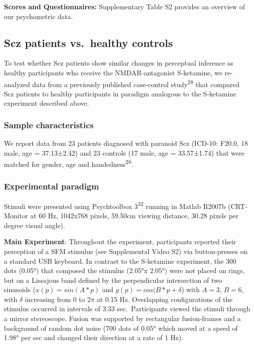 \documentclass[
]{article}
\begin{document}
\textbf{Scores and Questionnaires:} Supplementary Table S2 provides an
overview of our psychometric data.

\subsection{Scz patients vs.~healthy
controls}\label{scz-patients-vs.-healthy-controls}

To test whether Scz patients show similar changes in perceptual
inference as healthy participants who receive the NMDAR-antagonist
S-ketamine, we re-analyzed data from a previously published case-control
study\textsuperscript{28} that compared Scz patients to healthy
participants in paradigm analogous to the S-ketamine experiment
described above.

\subsubsection{Sample characteristics}\label{sample-characteristics-1}

We report data from 23 patients diagnosed with paranoid Scz (ICD-10:
F20.0, 18 male, age = 37.13±2.42) and 23 controls (17 male, age =
33.57±1.74) that were matched for gender, age and
handedness\textsuperscript{28}.

\subsubsection{Experimental paradigm}\label{experimental-paradigm-1}

Stimuli were presented using Psychtoolbox 3\textsuperscript{32} running
in Matlab R2007b (CRT-Monitor at 60 Hz, 1042x768 pixels, 59.50cm viewing
distance, 30.28 pixels per degree visual angle).

\textbf{Main Experiment}: Throughout the experiment, participants
reported their perception of a SFM stimulus (see Supplemental Video S2)
via button-presses on a standard USB keyboard. In contrast to the
S-ketamine experiment, the 300 dots (0.05°) that composed the stimulus
(2.05°x 2.05°) were not placed on rings, but on a Lissajous band defined
by the perpendicular intersection of two sinusoids (\(x(p) = sin(A*p)\)
and \(y(p) = cos(B*p + \delta\)) with \(A=3\), \(B=6\), with \(\delta\)
increasing from \(0\) to \(2\pi\) at 0.15 Hz. Overlapping configurations
of the stimulus occurred in intervals of 3.33 sec.~Participants viewed
the stimuli through a mirror stereoscope. Fusion was supported by
rectangular fusion-frames and a background of random dot noise (700 dots
of 0.05° which moved at a speed of 1.98° per sec and changed their
direction at a rate of 1 Hz).
\end{document}

